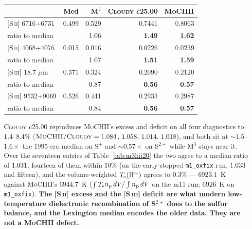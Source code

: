 \documentclass[english,a4paper]{my_memo}
\newcommand{\code}[1]{\texttt{#1}}
\newcommand{\MoCHII}{\textsc{MoCHII}}
\newcommand{\Mthree}{M$^3$}
\newcommand{\Cloudy}{\textsc{Cloudy}}
\newcommand{\Te}{T_{\rm e}}
\begin{document}
\begingroup\small
\begin{center}
\begin{tabular}{lrrrr}
\toprule
& Med & \Mthree{} & \Cloudy{} c25.00 & \MoCHII{} \\
\midrule
{}[S\,\textsc{ii}] 6716+6731  & 0.499  & 0.529  & 0.7441 & 0.8063 \\
\quad ratio to median         &        & 1.06   & \textbf{1.49}   & \textbf{1.62} \\
{}[S\,\textsc{ii}] 4068+4076  & 0.015  & 0.016  & 0.0226 & 0.0239 \\
\quad ratio to median         &        & 1.07   & \textbf{1.51}   & \textbf{1.59} \\
{}[S\,\textsc{iii}] 18.7 $\mu$m & 0.371 & 0.324 & 0.2090 & 0.2120 \\
\quad ratio to median         &        & 0.87   & \textbf{0.56}   & \textbf{0.57} \\
{}[S\,\textsc{iii}] 9532+9069 & 0.526  & 0.441  & 0.2933 & 0.2987 \\
\quad ratio to median         &        & 0.84   & \textbf{0.56}   & \textbf{0.57} \\
\bottomrule
\end{tabular}
\end{center}
\endgroup

\noindent
\Cloudy{} c25.00 reproduces \MoCHII{}'s excess and deficit on all four
diagnostics to $1.4$--$8.4\%$ ($\MoCHII{}/\Cloudy{} = 1.084$, $1.058$,
$1.014$, $1.018$), and both sit at $\sim\!1.5$--$1.6\times$ the 1995-era
median on S$^+$ and $\sim\!0.57\times$ on S$^{2+}$ while \Mthree{} stays near
it.  Over the seventeen entries of Table~\ref{tab:m3hii20} the two agree to a
median ratio of $1.031$, fourteen of them within $10\%$ (on the early-stopped
\code{m1\_oxfix} run, $1.033$ and fifteen), and the volume-weighted
$\Te({\rm H^+})$ agrees to $0.3\%$ --- $6923.1$~K against \MoCHII{}'s
$6944.7$~K ($\int \Te n_{\rm p}\,dV / \int n_{\rm p}\,dV$ on the
m11 run; $6926$~K on \code{m1\_oxfix}).  \textbf{The [S\,\textsc{ii}] excess and the
[S\,\textsc{iii}] deficit are what modern low-temperature dielectronic
recombination of S$^{2+}$ does to the sulfur balance, and the Lexington
median encodes the older data.  They are not a \MoCHII{} defect.}
\end{document}
